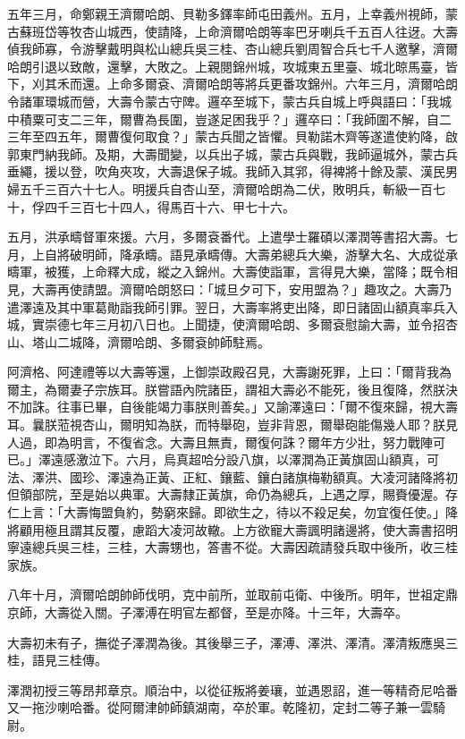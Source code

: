 \begin{pinyinscope}
五年三月，命鄭親王濟爾哈朗、貝勒多鐸率師屯田義州。五月，上幸義州視師，蒙古蘇班岱等牧杏山城西，使請降，上命濟爾哈朗等率巴牙喇兵千五百人往迓。大壽偵我師寡，令游擊戴明與松山總兵吳三桂、杏山總兵劉周智合兵七千人邀擊，濟爾哈朗引退以致敵，還擊，大敗之。上親閱錦州城，攻城東五里臺、城北晾馬臺，皆下，刈其禾而還。上命多爾袞、濟爾哈朗等將兵更番攻錦州。六年三月，濟爾哈朗令諸軍環城而營，大壽令蒙古守陴。邏卒至城下，蒙古兵自城上呼與語曰：「我城中積粟可支二三年，爾曹為長圍，豈遂足困我乎？」邏卒曰：「我師圍不解，自二三年至四五年，爾曹復何取食？」蒙古兵聞之皆懼。貝勒諾木齊等遂遣使約降，啟郭東門納我師。及期，大壽聞變，以兵出子城，蒙古兵與戰，我師逼城外，蒙古兵垂繩，援以登，吹角夾攻，大壽退保子城。我師入其郛，得裨將十餘及蒙、漢民男婦五千三百六十七人。明援兵自杏山至，濟爾哈朗為二伏，敗明兵，斬級一百七十，俘四千三百七十四人，得馬百十六、甲七十六。

五月，洪承疇督軍來援。六月，多爾袞番代。上遣學士羅碩以澤潤等書招大壽。七月，上自將破明師，降承疇。語見承疇傳。大壽弟總兵大樂，游擊大名、大成從承疇軍，被獲，上命釋大成，縱之入錦州。大壽使詣軍，言得見大樂，當降；既令相見，大壽再使請盟。濟爾哈朗怒曰：「城旦夕可下，安用盟為？」趣攻之。大壽乃遣澤遠及其中軍葛勛詣我師引罪。翌日，大壽率將吏出降，即日諸固山額真率兵入城，實崇德七年三月初八日也。上聞捷，使濟爾哈朗、多爾袞慰諭大壽，並令招杏山、塔山二城降，濟爾哈朗、多爾袞帥師駐焉。

阿濟格、阿達禮等以大壽等還，上御崇政殿召見，大壽謝死罪，上曰：「爾背我為爾主，為爾妻子宗族耳。朕嘗語內院諸臣，謂祖大壽必不能死，後且復降，然朕決不加誅。往事已畢，自後能竭力事朕則善矣。」又諭澤遠曰：「爾不復來歸，視大壽耳。曩朕蒞視杏山，爾明知為朕，而特舉砲，豈非背恩，爾舉砲能傷幾人耶？朕見人過，即為明言，不復省念。大壽且無責，爾復何誅？爾年方少壯，努力戰陣可已。」澤遠感激泣下。六月，烏真超哈分設八旗，以澤潤為正黃旗固山額真，可法、澤洪、國珍、澤遠為正黃、正紅、鑲藍、鑲白諸旗梅勒額真。大凌河諸降將初但領部院，至是始以典軍。大壽隸正黃旗，命仍為總兵，上遇之厚，賜賚優渥。存仁上言：「大壽悔盟負約，勢窮來歸。即欲生之，待以不殺足矣，勿宜復任使。」降將顧用極且謂其反覆，慮蹈大凌河故轍。上方欲寵大壽諷明諸邊將，使大壽書招明寧遠總兵吳三桂，三桂，大壽甥也，答書不從。大壽因疏請發兵取中後所，收三桂家族。

八年十月，濟爾哈朗帥師伐明，克中前所，並取前屯衛、中後所。明年，世祖定鼎京師，大壽從入關。子澤溥在明官左都督，至是亦降。十三年，大壽卒。

大壽初未有子，撫從子澤潤為後。其後舉三子，澤溥、澤洪、澤清。澤清叛應吳三桂，語見三桂傳。

澤潤初授三等昂邦章京。順治中，以從征叛將姜瓖，並遇恩詔，進一等精奇尼哈番又一拖沙喇哈番。從阿爾津帥師鎮湖南，卒於軍。乾隆初，定封二等子兼一雲騎尉。


\end{pinyinscope}

